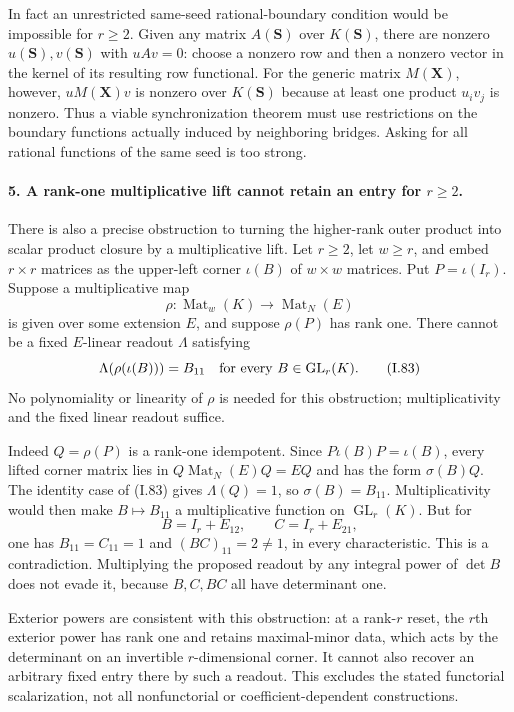 In fact an unrestricted same-seed rational-boundary condition would
be impossible for $r\ge2$. Given any matrix $A(\mathbf S)$ over
$K(\mathbf S)$, there are nonzero $u(\mathbf S),v(\mathbf S)$ with
$uAv=0$: choose a nonzero row and then a nonzero vector in the
kernel of its resulting row functional. For the generic matrix
$M(\mathbf X)$, however, $uM(\mathbf X)v$ is nonzero over
$K(\mathbf S)$ because at least one product $u_iv_j$ is nonzero.
Thus a viable synchronization theorem must use restrictions on the
boundary functions actually induced by neighboring bridges. Asking
for all rational functions of the same seed is too strong.

\paragraph{5. A rank-one multiplicative lift cannot retain an entry for $r\ge2$.}
There is also a precise obstruction to turning the higher-rank
outer product into scalar product closure by a multiplicative lift.
Let $r\ge2$, let $w\ge r$, and embed $r\times r$ matrices as the
upper-left corner $\iota(B)$ of $w\times w$ matrices. Put
$P=\iota(I_r)$. Suppose a multiplicative map
\[
 \rho:\operatorname{Mat}_w(K)\longrightarrow\operatorname{Mat}_N(E)
\]
is given over some extension $E$, and suppose $\rho(P)$ has rank
one. There cannot be a fixed $E$-linear readout $\Lambda$ satisfying
\[
 \Lambda(\rho(\iota(B)))=B_{11}
 \quad\hbox{for every }B\in\operatorname{GL}_r(K).
 \tag{I.83}
\]
No polynomiality or linearity of $\rho$ is needed for this obstruction;
multiplicativity and the fixed linear readout suffice.

Indeed $Q=\rho(P)$ is a rank-one idempotent. Since
$P\iota(B)P=\iota(B)$, every lifted corner matrix lies in
$Q\operatorname{Mat}_N(E)Q=EQ$ and has the form $\sigma(B)Q$.
The identity case of (I.83) gives $\Lambda(Q)=1$, so
$\sigma(B)=B_{11}$. Multiplicativity would then make $B\mapsto B_{11}$
a multiplicative function on $\operatorname{GL}_r(K)$. But for
\[
 B=I_r+E_{12},\qquad C=I_r+E_{21},
\]
one has $B_{11}=C_{11}=1$ and $(BC)_{11}=2\ne1$, in every
characteristic. This is a contradiction. Multiplying the proposed
readout by any integral power of $\det B$ does not evade it, because
$B,C,BC$ all have determinant one.

Exterior powers are consistent with this obstruction: at a rank-$r$
reset, the $r$th exterior power has rank one and retains maximal-minor
data, which acts by the determinant on an invertible $r$-dimensional
corner. It cannot also recover an arbitrary fixed entry there by
such a readout. This excludes the stated functorial scalarization,
not all nonfunctorial or coefficient-dependent constructions.

